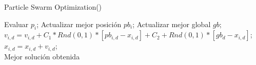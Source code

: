 \begin{algorithm}[p]
  \caption{Particle Swarm Optimization(\mbox{})}
  \label{pseu:pso}
  \begin{algorithmic}[1]
        \STATE Evaluar $ p_{i} $;
        \STATE Actualizar mejor posición $pb_{i}$;
        \STATE Actualizar mejor global $gb$;
      \ENDFOR
       \STATE $ v_{i,d} = v_{i,d} + C_{1} * Rnd(0,1) * [pb_{i,d} - x_{i,d}] + C_{2} + Rnd(0,1) * [gb_{d} - x_{i,d}] $;\\
            $ x_{i,d} = x_{i,d} + v_{i,d}$; \\
       \ENDFOR
      \ENDFOR
    \ENDWHILE
    \RETURN Mejor solución obtenida
  \end{algorithmic}
\end{algorithm}